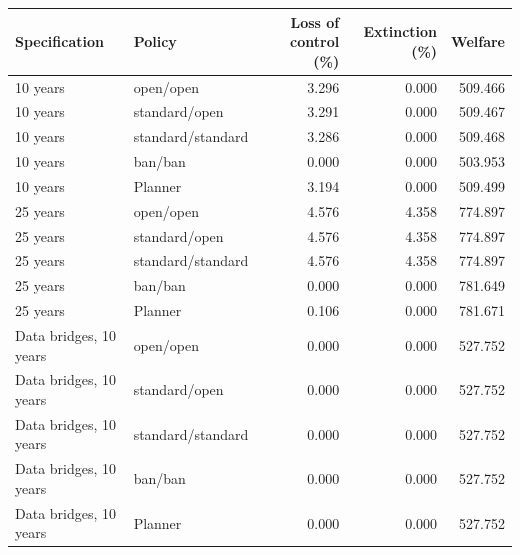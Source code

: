 \begin{tabular}{llrrr}
\toprule
Specification & Policy & Loss of control (\%) & Extinction (\%) & Welfare \\
\midrule
10 years & open/open & 3.296 & 0.000 & 509.466 \\
10 years & standard/open & 3.291 & 0.000 & 509.467 \\
10 years & standard/standard & 3.286 & 0.000 & 509.468 \\
10 years & ban/ban & 0.000 & 0.000 & 503.953 \\
10 years & Planner & 3.194 & 0.000 & 509.499 \\
25 years & open/open & 4.576 & 4.358 & 774.897 \\
25 years & standard/open & 4.576 & 4.358 & 774.897 \\
25 years & standard/standard & 4.576 & 4.358 & 774.897 \\
25 years & ban/ban & 0.000 & 0.000 & 781.649 \\
25 years & Planner & 0.106 & 0.000 & 781.671 \\
Data bridges, 10 years & open/open & 0.000 & 0.000 & 527.752 \\
Data bridges, 10 years & standard/open & 0.000 & 0.000 & 527.752 \\
Data bridges, 10 years & standard/standard & 0.000 & 0.000 & 527.752 \\
Data bridges, 10 years & ban/ban & 0.000 & 0.000 & 527.752 \\
Data bridges, 10 years & Planner & 0.000 & 0.000 & 527.752 \\
\bottomrule
\end{tabular}
